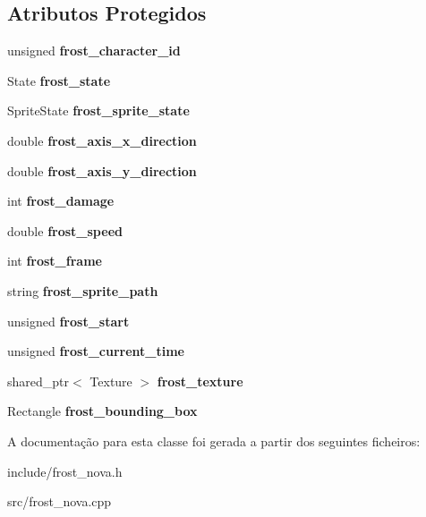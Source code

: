 \subsection*{Atributos Protegidos}
\begin{DoxyCompactItemize}
\item 
\mbox{\label{classFrostNova_ab400bee3d7b37b396b43e99498bca6ee}} 
unsigned {\bfseries frost\+\_\+character\+\_\+id}
\item 
\mbox{\label{classFrostNova_a1e4a13428ec6018ec32826352f5b3303}} 
State {\bfseries frost\+\_\+state}
\item 
\mbox{\label{classFrostNova_a8f4c3ad74186879c1364212c4a3316db}} 
Sprite\+State {\bfseries frost\+\_\+sprite\+\_\+state}
\item 
\mbox{\label{classFrostNova_a6629b7e6dca4a9cc39b475a7e1308b35}} 
double {\bfseries frost\+\_\+axis\+\_\+x\+\_\+direction}
\item 
\mbox{\label{classFrostNova_a256719b17a21ec85291b5970a4209f65}} 
double {\bfseries frost\+\_\+axis\+\_\+y\+\_\+direction}
\item 
\mbox{\label{classFrostNova_aa804b9ee177657db6a8651c825b2ea01}} 
int {\bfseries frost\+\_\+damage}
\item 
\mbox{\label{classFrostNova_a6d73e795f2a7379f9db5f04ca96c5b30}} 
double {\bfseries frost\+\_\+speed}
\item 
\mbox{\label{classFrostNova_ac86bc4b1a3fa29a5d756ec8272168bca}} 
int {\bfseries frost\+\_\+frame}
\item 
\mbox{\label{classFrostNova_a06f3570a18cfbd5dc174892c6afe5b87}} 
string {\bfseries frost\+\_\+sprite\+\_\+path}
\item 
\mbox{\label{classFrostNova_a6d4b037d224fbb3a24e440f0a65ea91f}} 
unsigned {\bfseries frost\+\_\+start}
\item 
\mbox{\label{classFrostNova_a0c361e55db3b455ef7f9853827c499e9}} 
unsigned {\bfseries frost\+\_\+current\+\_\+time}
\item 
\mbox{\label{classFrostNova_af786aadc5bfb732dbede1d0b9739a13e}} 
shared\+\_\+ptr$<$ Texture $>$ {\bfseries frost\+\_\+texture}
\item 
\mbox{\label{classFrostNova_afaaeffacf92544fe075ae03eb044b261}} 
Rectangle {\bfseries frost\+\_\+bounding\+\_\+box}
\end{DoxyCompactItemize}


A documentação para esta classe foi gerada a partir dos seguintes ficheiros\+:\begin{DoxyCompactItemize}
\item 
include/frost\+\_\+nova.\+h\item 
src/frost\+\_\+nova.\+cpp\end{DoxyCompactItemize}

